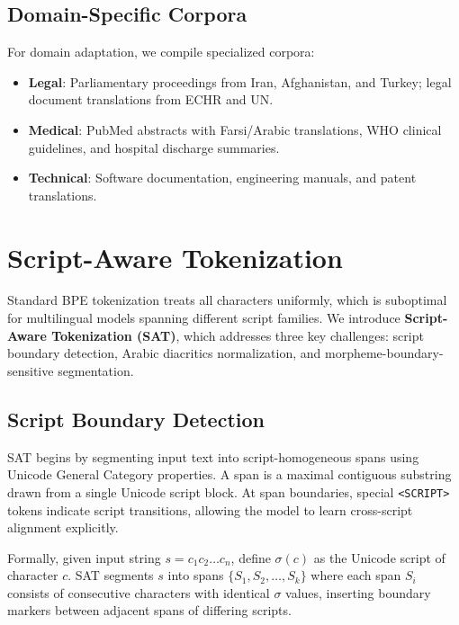 \documentclass[11pt,twocolumn]{article}
\begin{document}
\subsection{Domain-Specific Corpora}

For domain adaptation, we compile specialized corpora:
\begin{itemize}[leftmargin=*,noitemsep]
  \item \textbf{Legal}: Parliamentary proceedings from Iran, Afghanistan,
        and Turkey; legal document translations from ECHR and UN.
  \item \textbf{Medical}: PubMed abstracts with Farsi/Arabic translations,
        WHO clinical guidelines, and hospital discharge summaries.
  \item \textbf{Technical}: Software documentation, engineering manuals,
        and patent translations.
\end{itemize}

\section{Script-Aware Tokenization}
\label{sec:sat}

Standard BPE tokenization \citep{sennrich2016neural} treats all characters
uniformly, which is suboptimal for multilingual models spanning different
script families. We introduce \textbf{Script-Aware Tokenization (SAT)}, which
addresses three key challenges: script boundary detection, Arabic diacritics
normalization, and morpheme-boundary-sensitive segmentation.

\subsection{Script Boundary Detection}

SAT begins by segmenting input text into script-homogeneous spans using Unicode
General Category properties. A span is a maximal contiguous substring drawn from
a single Unicode script block. At span boundaries, special \texttt{<SCRIPT>}
tokens indicate script transitions, allowing the model to learn cross-script
alignment explicitly.

Formally, given input string $s = c_1 c_2 \ldots c_n$, define $\sigma(c)$ as
the Unicode script of character $c$. SAT segments $s$ into spans
$\{S_1, S_2, \ldots, S_k\}$ where each span $S_i$ consists of consecutive
characters with identical $\sigma$ values, inserting boundary markers between
adjacent spans of differing scripts.
\end{document}
